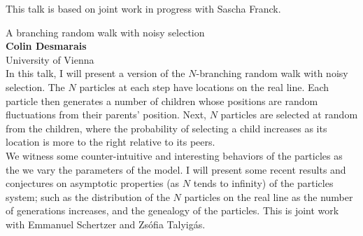 \documentclass[12pt,a4paper]{article}
\begin{document}
This talk is based on joint work in progress with Sascha Franck.




\bigskip \bigskip  %

\noindent
{\Large A branching random walk with noisy selection}\\[1ex]
{\large 
\textbf{Colin Desmarais}\\[1ex] University of Vienna }\\[2ex]
In this talk, I will present a version of the $N$-branching random walk with noisy selection. The $N$ particles at each step have locations on the real line. Each particle then generates a number of children whose positions are random fluctuations from their parents' position. Next, $N$ particles are selected at random from the children, where the probability of selecting a child increases as its location is more to the right relative to its peers.
\\
We witness some counter-intuitive and interesting behaviors of the particles as the we vary the parameters of the model. I will present some recent results and conjectures on asymptotic properties (as $N$ tends to infinity) of the particles system; such as the distribution of the $N$ particles on the real line as the number of generations increases, and the genealogy of the particles. This is joint work with Emmanuel Schertzer and Zsófia Talyigás. 
\end{document}

